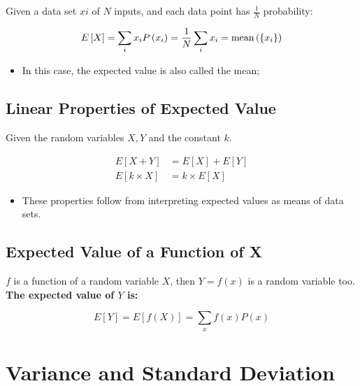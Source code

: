     Given a data set $ x{i} $ of $ N $ inputs, and each data point has $ \frac{1}{N} $ probability:
    
    \begin{equation}\label{eq: ch4-expected-value-as-mean}
      E \left[ X \right] = \sum_{i} x_{i} P\left( x_{i} \right) = \frac{1}{N} \sum_{i} x_{i} = \operatorname{mean} \left( \{ x_{i} \} \right)
    \end{equation}
  
    \begin{itemize}
      \item In this case, the expected value is also called the mean;
    \end{itemize}
    
  \subsection{Linear Properties of Expected Value}
    
    Given the random variables $ X, Y $ and the constant $ k $.
    
    \begin{align}
      E \left[ X + Y \right] &= E \left[ X \right] + E \left[ Y \right] \\ 
      E \left[ k \times X \right] &= k \times E \left[ X \right]
    \end{align}
    
    \begin{itemize}
      \item These properties follow from interpreting expected values as means of data sets.
    \end{itemize}
    
  \subsection{Expected Value of a Function of X}
  
    $ f $ is a function of a random variable $ X $, then $ Y = f(x) $ is a random variable too. \textbf{The expected value of $ Y $ is:}
    
    \begin{equation}
      E \left[ Y \right] = E \left[ f (X) \right] = \sum_{x} f(x) P(x)
    \end{equation}
    
\section{Variance and Standard Deviation}

